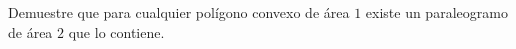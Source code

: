  Demuestre que para cualquier polígono convexo de área $1$ existe un paraleogramo de área $2$ que lo contiene. 